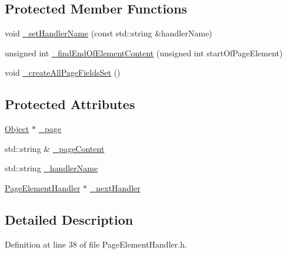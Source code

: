 \subsection*{Protected Member Functions}
\begin{DoxyCompactItemize}
\item 
void \hyperlink{classmerge__lib_1_1_page_element_handler_a814dec7a28f99916d36d0ad3ca41336c}{\-\_\-set\-Handler\-Name} (const std\-::string \&handler\-Name)
\item 
unsigned int \hyperlink{classmerge__lib_1_1_page_element_handler_a2164e57a4264777fa75b091967c2cb23}{\-\_\-find\-End\-Of\-Element\-Content} (unsigned int start\-Of\-Page\-Element)
\item 
void \hyperlink{classmerge__lib_1_1_page_element_handler_ad1ea53e426b1cbba56d7c1b1ec475461}{\-\_\-create\-All\-Page\-Fields\-Set} ()
\end{DoxyCompactItemize}
\subsection*{Protected Attributes}
\begin{DoxyCompactItemize}
\item 
\hyperlink{classmerge__lib_1_1_object}{Object} $\ast$ \hyperlink{classmerge__lib_1_1_page_element_handler_a52d5dd4a33423e5da12fb0317303e6ab}{\-\_\-page}
\item 
std\-::string \& \hyperlink{classmerge__lib_1_1_page_element_handler_a489f2d42f7bcdae272b81caa93badf14}{\-\_\-page\-Content}
\item 
std\-::string \hyperlink{classmerge__lib_1_1_page_element_handler_a794f4d90a0b09b60d60b00c0ebde68c6}{\-\_\-handler\-Name}
\item 
\hyperlink{classmerge__lib_1_1_page_element_handler}{Page\-Element\-Handler} $\ast$ \hyperlink{classmerge__lib_1_1_page_element_handler_a3f2f76c9182628763aafd37a2020b6e0}{\-\_\-next\-Handler}
\end{DoxyCompactItemize}


\subsection{Detailed Description}


Definition at line 38 of file Page\-Element\-Handler.\-h.




